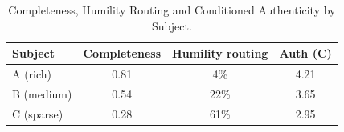 \begin{table}[htbp]
\caption{Completeness, Humility Routing and Conditioned Authenticity by Subject.}
\label{tab:completeness_gradient}
\centering
\begin{tabular}{lccc}
\toprule
\textbf{Subject} & \textbf{Completeness} & \textbf{Humility routing} & \textbf{Auth (C)} \\
\midrule
A (rich)   & 0.81 & 4\%  & 4.21 \\
B (medium) & 0.54 & 22\% & 3.65 \\
C (sparse) & 0.28 & 61\% & 2.95 \\
\bottomrule
\end{tabular}
\end{table}
